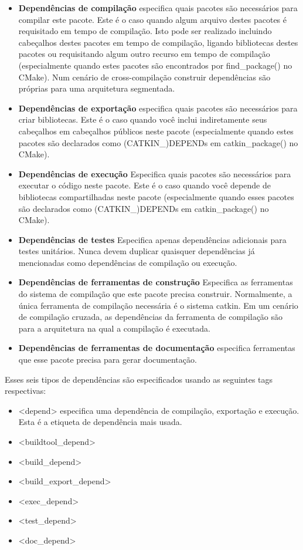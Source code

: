 \begin{itemize}
	\setlength{\itemsep}{1pt}
	\setlength{\parskip}{0pt}
	\setlength{\parsep}{0pt}
	\item \textbf{Dependências de compilação} especifica quais pacotes são necessários para compilar este pacote. Este é o caso quando algum arquivo destes pacotes é requisitado em tempo de compilação. Isto pode ser realizado incluindo cabeçalhos destes pacotes em tempo de compilação, ligando bibliotecas destes pacotes ou requisitando algum outro recurso em tempo de compilação (especialmente quando estes pacotes são encontrados por find\_package() no CMake). Num cenário de cross-compilação construir dependências são próprias para uma arquitetura segmentada.
	\item \textbf{Dependências de exportação} 
	especifica quais pacotes são necessários para criar bibliotecas. Este é o caso quando você inclui indiretamente seus cabeçalhos em cabeçalhos públicos neste pacote (especialmente quando estes pacotes são declarados como (CATKIN\_)DEPENDs em catkin\_package() no CMake).
	\item \textbf{Dependências de execução} 
	Especifica quais pacotes são necessários para executar o código neste pacote. Este é o caso quando você depende de bibliotecas compartilhadas neste pacote (especialmente quando esses pacotes são declarados como (CATKIN\_)DEPENDs em catkin\_package() no CMake).
	\item \textbf{Dependências de testes} 
	Especifica apenas dependências adicionais para testes unitários. Nunca devem duplicar quaisquer dependências já mencionadas como dependências de compilação ou execução.
	\item \textbf{Dependências de ferramentas de construção} Especifica as ferramentas do sistema de compilação que este pacote precisa construir. Normalmente, a única ferramenta de compilação necessária é o sistema catkin. Em um cenário de compilação cruzada, as dependências da ferramenta de compilação são para a arquitetura na qual a compilação é executada.
	\item \textbf{Dependências de ferramentas de documentação} especifica ferramentas que esse pacote precisa para gerar documentação.
\end{itemize}

Esses seis tipos de dependências são especificados usando as seguintes tags respectivas:

\begin{itemize}
	\setlength{\itemsep}{1pt}
	\setlength{\parskip}{0pt}
	\setlength{\parsep}{0pt}
	\item []<depend> especifica uma dependência de compilação, exportação e execução. Esta é a etiqueta de dependência mais usada.
	\item []<buildtool\_depend>
	\item []<build\_depend>
	\item []<build\_export\_depend>
	\item []<exec\_depend>
	\item []<test\_depend>
	\item []<doc\_depend>
\end{itemize}

